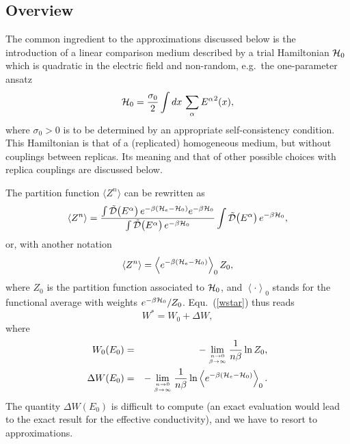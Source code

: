 \subsection{Overview}
\label{o} 
The common ingredient to the approximations discussed
below is the introduction of a linear comparison medium
described by a trial Hamiltonian ${\cal{H}}_0$ which is quadratic in the
electric field and non-random, e.g.\ the one-parameter ansatz
\begin{equation}
\label{trybrug}
{\cal{H}}_0=\frac{\sigma_0}{2}\int dx\,\sum_{\alpha}{E^{\alpha}}^2(x),
\end{equation}
where $\sigma_0>0$ is to be determined by an
appropriate self-consistency condition.
This Hamiltonian is that of a (replicated) homogeneous medium,
but without couplings between replicas. Its meaning and that of
other possible choices with replica couplings are discussed below.

The partition function $\langle Z^n\rangle$ can be rewritten as
\begin{equation}
\left\langle Z^n\right\rangle =
\frac{ \int{\tilde{\cal{D}}}\bigl(E^{\alpha}\bigr)\, e^{-\beta({\cal{H}}_e-{\cal{H}}_0)}e^{-\beta{\cal{H}}_0} }{ \int{\tilde{\cal{D}}}\bigl(E^{\alpha}\bigr)\,e^{-\beta{\cal{H}}_0} }
\int{\tilde{\cal{D}}}\bigl(E^{\alpha}\bigr)\,e^{-\beta{\cal{H}}_0}
,
\end{equation}
or, with another notation
\begin{equation}
\label{znmoyen2}
\left\langle Z^n\right\rangle =
\left\langle
e^{-\beta({\cal{H}}_e-{\cal{H}}_0)}
\right\rangle_0 Z_0,
\end{equation}
where $Z_0$ is the partition function associated to ${\cal{H}}_0$, and
$\left\langle\cdot\right\rangle_0$ stands for the functional average with
weights $e^{-\beta{\cal{H}}_0}/Z_0$. Equ.\ (\ref{wstar}) thus reads
\begin{equation}
\label{wsplit}
W^*=W_0+\Delta W,
\end{equation}
where
\begin{eqnarray}
\label{wo}
W_0(E_0)&=&-\lim_{n\to 0\atop \beta\to\infty}\frac{1}{n\beta}\ln Z_0,\\
\label{dwo}
\Delta W(E_0)&=&-\lim_{n\to 0\atop \beta\to\infty}\frac{1}{n\beta}
\ln \left\langle e^{-\beta({\cal{H}}_e-{\cal{H}}_0)}
\right\rangle_0.
\end{eqnarray}
The quantity $\Delta W(E_0)$ is difficult to compute (an exact evaluation
would lead to the exact result for the effective conductivity),
and we have to resort to approximations.

